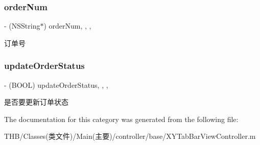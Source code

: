 \subsubsection{\texorpdfstring{order\+Num}{orderNum}}
{\footnotesize\ttfamily -\/ (N\+S\+String$\ast$) order\+Num\hspace{0.3cm}{\ttfamily [read]}, {\ttfamily [write]}, {\ttfamily [nonatomic]}, {\ttfamily [strong]}}

订单号 \mbox{\label{category_x_y_tab_bar_view_controller_07_08_af097c12f9b43d773f3d6fd0d407ace81}} 
\subsubsection{\texorpdfstring{update\+Order\+Status}{updateOrderStatus}}
{\footnotesize\ttfamily -\/ (B\+O\+OL) update\+Order\+Status\hspace{0.3cm}{\ttfamily [read]}, {\ttfamily [write]}, {\ttfamily [nonatomic]}, {\ttfamily [assign]}}

是否要更新订单状态 

The documentation for this category was generated from the following file\+:\begin{DoxyCompactItemize}
\item 
T\+H\+B/\+Classes(类文件)/\+Main(主要)/controller/base/X\+Y\+Tab\+Bar\+View\+Controller.\+m\end{DoxyCompactItemize}
